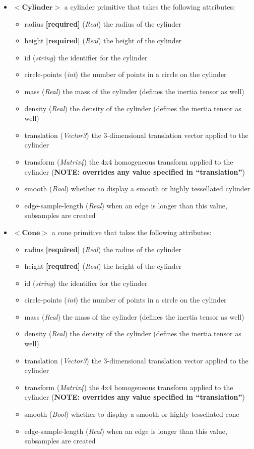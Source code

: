 \documentclass{article}
\begin{document}
\begin{landscape}
\begin{itemize}
\item $<\textbf{Cylinder}>$ a cylinder primitive that takes the following attributes:
\begin{itemize}
\item radius \textbf{[required]} (\emph{Real}) the radius of the cylinder
\item height \textbf{[required]} (\emph{Real}) the height of the cylinder
\item id  (\emph{string}) the identifier for the cylinder
\item circle-points (\emph{int}) the number of points in a circle on the cylinder
\item mass (\emph{Real}) the mass of the cylinder (defines the inertia tensor as well)
\item density (\emph{Real})  the density of the cylinder  (defines the inertia tensor as well)
\item translation (\emph{Vector3}) the 3-dimensional translation vector applied to the cylinder 
\item transform (\emph{Matrix4}) the 4x4 homogeneous transform applied to the cylinder (\textbf{NOTE: overrides any value specified in ``translation''})
\item smooth (\emph{Bool}) whether to display a smooth or highly tessellated cylinder
\item edge-sample-length (\emph{Real}) when an edge is longer than this value, subsamples are created
\end{itemize}

\item $<\textbf{Cone}>$ a cone primitive that takes the following attributes:
\begin{itemize}
\item radius \textbf{[required]} (\emph{Real}) the radius of the cylinder
\item height \textbf{[required]} (\emph{Real}) the height of the cylinder
\item id  (\emph{string}) the identifier for the cylinder
\item circle-points (\emph{int}) the number of points in a circle on the cylinder
\item mass (\emph{Real}) the mass of the cylinder (defines the inertia tensor as well)
\item density (\emph{Real})  the density of the cylinder  (defines the inertia tensor as well)
\item translation (\emph{Vector3}) the 3-dimensional translation vector applied to the cylinder 
\item transform (\emph{Matrix4}) the 4x4 homogeneous transform applied to the cylinder (\textbf{NOTE: overrides any value specified in ``translation''})
\item smooth (\emph{Bool}) whether to display a smooth or highly tessellated cone
\item edge-sample-length (\emph{Real}) when an edge is longer than this value, subsamples are created
\end{itemize}



\end{itemize}
\end{landscape}
\end{document}
